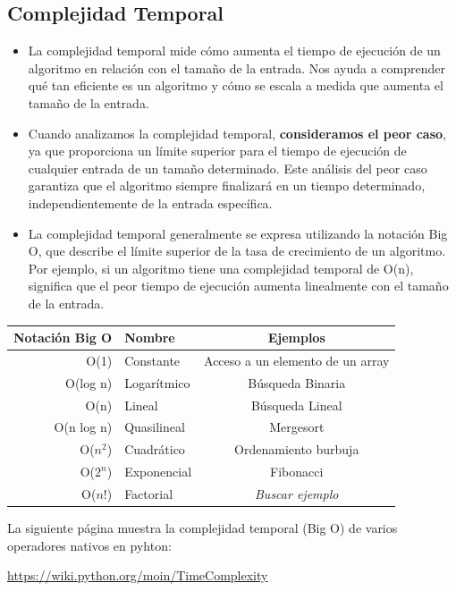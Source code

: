 \documentclass[xcolor=table]{beamer}
\begin{document}
\subsection{Complejidad Temporal}
\begin{frame}  \small  

\begin{itemize}
    \item La complejidad temporal mide cómo aumenta el tiempo de ejecución de un algoritmo en relación con el tamaño de la entrada. Nos ayuda a comprender qué tan eficiente es un algoritmo y cómo se escala a medida que aumenta el tamaño de la entrada.

\item Cuando analizamos la complejidad temporal, \textbf{consideramos el peor caso}, ya que proporciona un límite superior para el tiempo de ejecución de cualquier entrada de un tamaño determinado. Este análisis del peor caso garantiza que el algoritmo siempre finalizará en un tiempo determinado, independientemente de la entrada específica.

\item La complejidad temporal generalmente se expresa utilizando la notación Big O, que describe el límite superior de la tasa de crecimiento de un algoritmo. Por ejemplo, si un algoritmo tiene una complejidad temporal de O(n), significa que el peor tiempo de ejecución aumenta linealmente con el tamaño de la entrada.
\end{itemize}

\end{frame} 

\begin{frame}  \small  


\begin{table}[t]
\begin{center}
\begin{tabular}{| r | l | c |}
\hline
Notación Big O & Nombre & Ejemplos \\ \hline
O(1)  & Constante & Acceso a un elemento de un array \\
O(log n) & Logarítmico & Búsqueda Binaria \\
O(n) & Lineal & Búsqueda Lineal \\ 
O(n log n) & Quasilineal & Mergesort  \\
O($n^2$) & Cuadrático & Ordenamiento burbuja \\ 
O($2^n$) & Exponencial & Fibonacci \\ 
O($n!$) & Factorial &  \textit{Buscar ejemplo} \\ \hline
\end{tabular}
\label{tab:BigO}
\end{center}
\end{table}

La siguiente página muestra la complejidad temporal (Big O) de varios operadores nativos en pyhton:

\url{https://wiki.python.org/moin/TimeComplexity}

\end{frame} 
\end{document}
